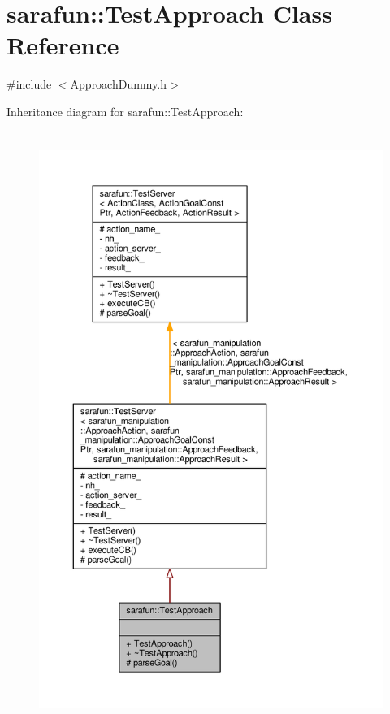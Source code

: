 \hypertarget{classsarafun_1_1TestApproach}{\section{sarafun\-:\-:Test\-Approach Class Reference}
\label{classsarafun_1_1TestApproach}
}


{\ttfamily \#include $<$Approach\-Dummy.\-h$>$}



Inheritance diagram for sarafun\-:\-:Test\-Approach\-:\nopagebreak
\begin{figure}[H]
\begin{center}
\leavevmode
\includegraphics[height=550pt]{d9/d9a/classsarafun_1_1TestApproach__inherit__graph}
\end{center}
\end{figure}


